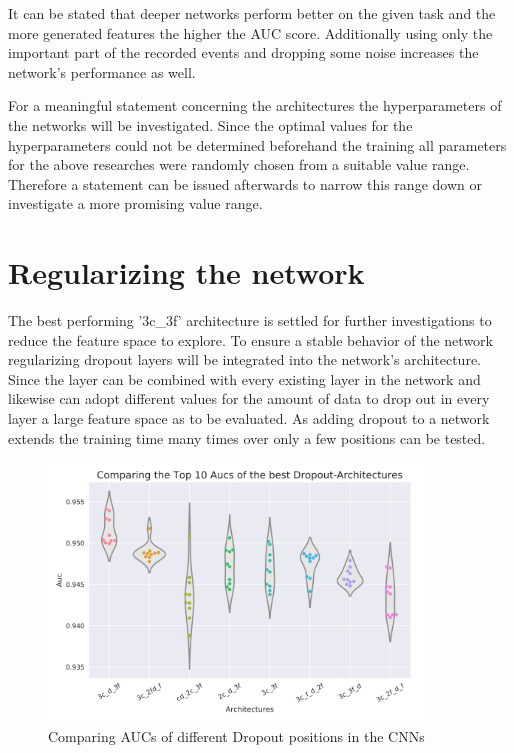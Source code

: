 It can be stated that deeper networks perform better on the given task
and the more generated features the higher the AUC score.
Additionally using only the important part of the recorded events
and dropping some noise increases the network's performance as well.

For a meaningful statement concerning the architectures the hyperparameters of the networks will be investigated.
Since the optimal values for the hyperparameters could not be determined beforehand the training
all parameters for the above researches were randomly chosen from a suitable value range.
Therefore a statement can be issued afterwards to narrow this range down or investigate a more promising value range.




\section{Regularizing the network}
The best performing '3c\_3f' architecture is settled for further investigations to reduce the feature space to explore.
To ensure a stable behavior of the network regularizing dropout layers will be integrated into the network's architecture.
Since the layer can be combined with every existing layer in the network
and likewise can adopt different values for the amount of data to drop out in every layer
a large feature space as to be evaluated.
As adding dropout to a network extends the training time many times over only a few positions can be tested.

\begin{figure}
    \centering
    \includegraphics[width=10cm]{Plots/Randomized_Dropout_Model_Comparison.png}
    \caption{Comparing AUCs of different Dropout positions in the CNNs}
    \label{fig:random_dropout}
\end{figure}


